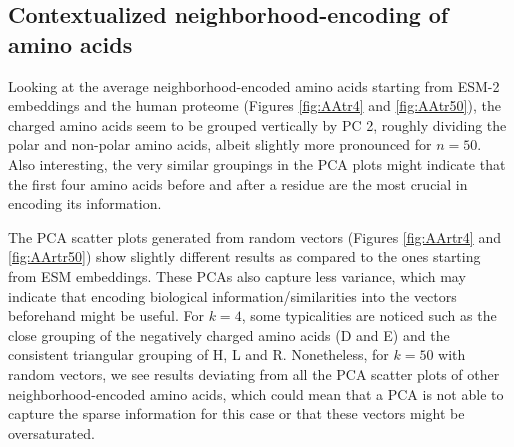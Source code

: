 \subsection{Contextualized neighborhood-encoding of amino acids}
Looking at the average neighborhood-encoded amino acids starting from ESM-2 embeddings and the human proteome (Figures \ref{fig:AAtr4} and \ref{fig:AAtr50}), the charged amino acids seem to be grouped vertically by PC 2, roughly dividing the polar and non-polar amino acids, albeit slightly more pronounced for $n = 50$. Also interesting, the very similar groupings in the PCA plots might indicate that the first four amino acids before and after a residue are the most crucial in encoding its information.

The PCA scatter plots generated from random vectors (Figures \ref{fig:AArtr4} and \ref{fig:AArtr50}) show slightly different results as compared to the ones starting from ESM embeddings. These PCAs also capture less variance, which may indicate that encoding biological information/similarities into the vectors beforehand might be useful. For $k = 4$, some typicalities are noticed such as the close grouping of the negatively charged amino acids (D and E) and the consistent triangular grouping of H, L and R. Nonetheless, for $k = 50$ with random vectors, we see results deviating from all the PCA scatter plots of other neighborhood-encoded amino acids, which could mean that a PCA is not able to capture the sparse information for this case or that these vectors might be oversaturated.

